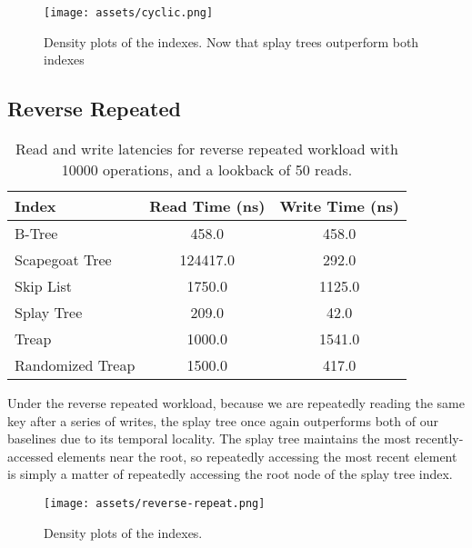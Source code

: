 \documentclass[sigconf]{acmart}
\begin{document}
\begin{center}
  \begin{figure}[H]
    \texttt{[image: assets/cyclic.png]}
    \caption{Density plots of the indexes. Now that splay trees outperform both indexes}
  \end{figure}
\end{center}


\subsection{Reverse Repeated}
\begin{center}
  \begin{table}[H]
    \begin{tabular}{|l|c|c|}
      \hline
      \bf{Index} & \bf{Read Time (ns)} & \bf{Write Time (ns)} \\
      \hline
      B-Tree&458.0&458.0\\
      \hline
      Scapegoat Tree&124417.0&292.0\\
      \hline
      Skip List&1750.0&1125.0\\
      \hline
      Splay Tree&209.0&42.0\\
      \hline
      Treap&1000.0&1541.0\\
      \hline
      Randomized Treap&1500.0&417.0\\
      \hline
    \end{tabular}
    \caption{Read and write latencies for reverse repeated workload with 10000 operations, and a lookback of 50 reads.}
  \end{table}
\end{center}
Under the reverse repeated workload, because we are repeatedly reading the same key after a series of writes, the splay tree once again outperforms both of our baselines due to its temporal locality. The splay tree maintains the most recently-accessed elements near the root, so repeatedly accessing the most recent element is simply a matter of repeatedly accessing the root node of the splay tree index.
\begin{center}
  \begin{figure}[H]
    \texttt{[image: assets/reverse-repeat.png]}
    \caption{Density plots of the indexes.}
  \end{figure}
\end{center}
\newpage
\end{document}
